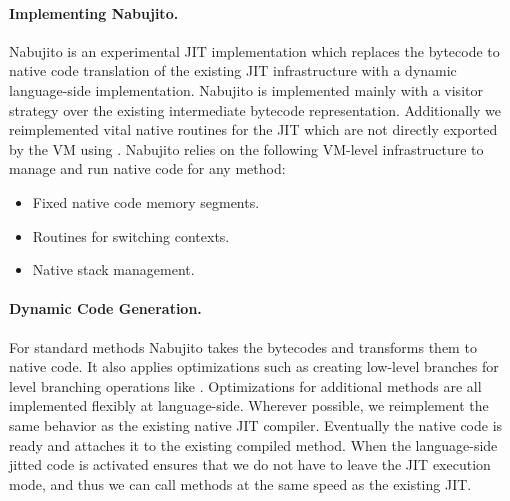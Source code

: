 \paragraph{Implementing Nabujito.}
Nabujito is an experimental JIT implementation which replaces the bytecode to native code translation of the existing JIT infrastructure with a dynamic language-side implementation.
Nabujito is implemented mainly with a visitor strategy over the existing intermediate bytecode representation. 
Additionally we reimplemented vital native routines for the JIT which are not directly exported by the VM using \B. 
Nabujito relies on the following VM-level infrastructure to manage and run native code for any \PH method:

\begin{itemize}
	\item Fixed native code memory segments.
	\item Routines for switching contexts.
	\item Native stack management.
\end{itemize}

\paragraph{Dynamic Code Generation.}
For standard methods Nabujito takes the bytecodes and transforms them to native code.
It also applies optimizations such as creating low-level branches for \ST level branching operations like .
Optimizations for additional methods are all implemented flexibly at language-side.
Wherever possible, we reimplement the same behavior as the existing native JIT compiler.
Eventually the native code is ready and \B attaches it to the existing compiled method.
When the language-side jitted code is activated \B ensures that we do not have to leave the JIT execution mode, and thus we can call methods at the same speed as the existing JIT.

